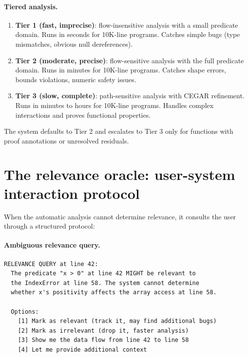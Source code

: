 \documentclass[11pt]{report}
\theoremstyle{definition}
\theoremstyle{plain}
\begin{document}
\paragraph{Tiered analysis.}
\begin{enumerate}[nosep]
  \item \textbf{Tier 1 (fast, imprecise)}: flow-insensitive analysis with
        a small predicate domain. Runs in seconds for 10K-line programs.
        Catches simple bugs (type mismatches, obvious null dereferences).
  \item \textbf{Tier 2 (moderate, precise)}: flow-sensitive analysis with
        the full predicate domain. Runs in minutes for 10K-line programs.
        Catches shape errors, bounds violations, numeric safety issues.
  \item \textbf{Tier 3 (slow, complete)}: path-sensitive analysis with
        CEGAR refinement. Runs in minutes to hours for 10K-line programs.
        Handles complex interactions and proves functional properties.
\end{enumerate}

The system defaults to Tier 2 and escalates to Tier 3 only for functions with
proof annotations or unresolved residuals.

\section{The relevance oracle: user-system interaction protocol}

When the automatic analysis cannot determine relevance, it consults the user
through a structured protocol:

\paragraph{Ambiguous relevance query.}
\begin{lstlisting}[language={}]
RELEVANCE QUERY at line 42:
  The predicate "x > 0" at line 42 MIGHT be relevant to
  the IndexError at line 58. The system cannot determine
  whether x's positivity affects the array access at line 58.

  Options:
    [1] Mark as relevant (track it, may find additional bugs)
    [2] Mark as irrelevant (drop it, faster analysis)
    [3] Show me the data flow from line 42 to line 58
    [4] Let me provide additional context
\end{lstlisting}
\end{document}
